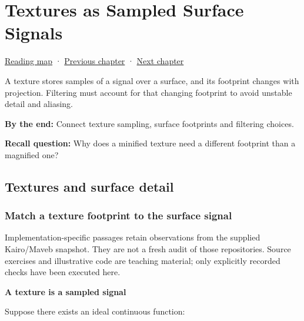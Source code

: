 \chapter{Textures as Sampled Surface Signals}\label{03-visual-computing-i-ch019-textures-as-sampled-surface-signals}\hypertarget{03-visual-computing-i-ch019}{}\label{stagechapter:03-visual-computing-i-ch019}

\hypertarget{03-visual-computing-i-ch019-textures-as-sampled-surface-signals}{}

\hyperref[volume-reading-map]{Reading map} · \hyperref[03-visual-computing-i-ch015]{Previous chapter} · \hyperref[04-visual-computing-ii-ch035]{Next chapter}

A texture stores samples of a signal over a surface, and its footprint changes with projection. Filtering must account for that changing footprint to avoid unstable detail and aliasing.

\textbf{By the end:} Connect texture sampling, surface footprints and filtering choices.

\textbf{Recall question:} Why does a minified texture need a different footprint than a magnified one?

\section{Textures and surface detail}\label{03-visual-computing-i-ch019-textures-and-surface-detail}

\hypertarget{03-visual-computing-i-ch019-textures-and-surface-detail}{}

\subsection{Match a texture footprint to the surface signal}\label{03-visual-computing-i-ch019-match-a-texture-footprint-to-the-surface-signal}

\hypertarget{03-visual-computing-i-ch019-match-a-texture-footprint-to-the-surface-signal}{}

Implementation-specific passages retain observations from the supplied Kairo/Maveb snapshot. They are not a fresh audit of those repositories. Source exercises and illustrative code are teaching material; only explicitly recorded checks have been executed here.

\textbf{A texture is a sampled signal}

Suppose there exists an ideal continuous function:

